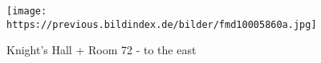 \documentclass[
  a4paper,
]{book}
\begin{document}
\begin{figure*}
\clearpage

\begin{figure}[H]    
  \texttt{[image: https://previous.bildindex.de/bilder/fmd10005860a.jpg]}
  \caption{Knight's Hall + Room 72 - to the east}
  \label{fig:{https://previous.bildindex.de/bilder/fmd10005860a.jpg}}
\end{figure}

\clearpage

\end{figure*}%


\backmatter

\printindex
\end{document}
